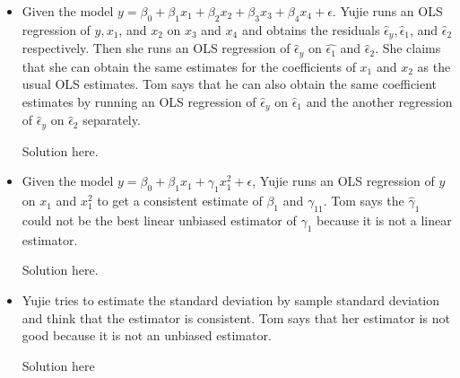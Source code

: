 \documentclass[11pt]{SelfArxOneColBMN}
\begin{document}
\begin{exercise}
	\begin{itemize}
		\item Given the model $y = \beta_0 + \beta_1x_1 + \beta_2x_2 + \beta_3x_3 + \beta_4x_4 + \epsilon$. Yujie runs an OLS regression of $y, x_1$, and $x_2$ on $x_3$ and $x_4$ and obtains the residuals $\hat{\epsilon}_y, \hat{\epsilon}_1$, and $\hat{\epsilon}_2$ respectively. Then she runs an OLS regression of $\hat{\epsilon}_y$ on $\hat{\epsilon_1}$ and $\hat{\epsilon}_2$. She claims that she can obtain the same estimates for the coefficients of $x_1$ and $x_2$ as the usual OLS estimates. Tom says that he can also obtain the same coefficient estimates by running an OLS regression of $\hat{\epsilon}_y$ on $\hat{\epsilon}_1$ and the another regression of $\hat{\epsilon}_y$ on $\hat{\epsilon}_2$ separately.
		\begin{solution}
			Solution here.
		\end{solution}
		\item Given the model $y = \beta_0 + \beta_1x_1 + \gamma_1x_1^2 + \epsilon$, Yujie runs an OLS regression of $y$ on $x_1$ and $x_1^2$ to get a consistent estimate of $\beta_1$ and $\gamma_11$. Tom says the $\hat{\gamma}_1$ could not be the best linear unbiased estimator of $\gamma_1$ because it is not a linear estimator.
		\begin{solution}
			Solution here.
		\end{solution}
		\item Yujie tries to estimate the standard deviation by sample standard deviation and think that the estimator is consistent. Tom says that her estimator is not good because it is not an unbiased estimator. 
		\begin{solution}
			Solution here
		\end{solution}
	\end{itemize}
\end{exercise}
\end{document}

